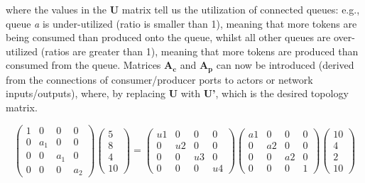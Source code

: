 where the values in the \textbf{U} matrix tell us the utilization of connected queues: e.g., queue \textit{a} is under-utilized (ratio is smaller than 1), meaning that more tokens are being consumed than produced onto the queue, whilst all other queues are over-utilized (ratios are greater than 1), meaning that more tokens are produced than consumed from the queue. Matrices $\textbf{A}_{\textbf{c}}$ and $\textbf{A}_{\textbf{p}}$ can now be introduced (derived from the connections of consumer/producer ports to actors or network inputs/outputs), where, by replacing \textbf{U} with \textbf{U'}, which is the desired topology matrix.

\begin{equation}
\begin{pmatrix}
  1 & 0 & 0  & 0 \\
  0 & a_1 & 0 & 0 \\
  0 & 0 & a_1  & 0 \\
  0 & 0 & 0 & a_2 
 \end{pmatrix}
\begin{pmatrix}
  5  \\
  8  \\
  4  \\
  10
 \end{pmatrix}
=
\begin{pmatrix}
  u1 & 0 & 0  & 0 \\
  0 & u2 & 0 & 0 \\
  0 & 0 & u3  & 0 \\
  0 & 0 & 0 & u4 
 \end{pmatrix}
\begin{pmatrix}
  a1 & 0 & 0  & 0 \\
  0 & a2 & 0 & 0 \\
  0 & 0 & a2  & 0 \\
  0 & 0 & 0 & 1 
 \end{pmatrix}
 \begin{pmatrix}
  10  \\
  4  \\
  2  \\
  10  
 \end{pmatrix}\end{equation}

